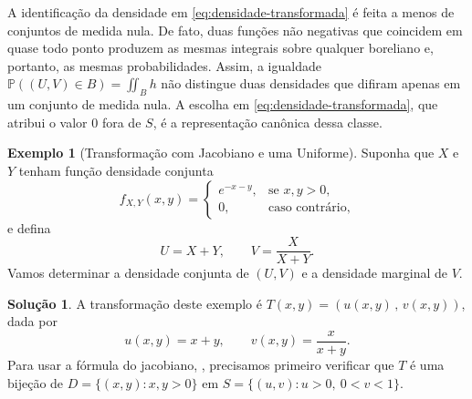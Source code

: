 \documentclass[12pt,portuguese]{article}
\theoremstyle{definition}
\newtheorem{example}[example]{Exemplo}
\theoremstyle{plainexercise}
\theoremstyle{starredexercise}
\theoremstyle{definition}
\newtheorem*{solution}{Solução}
\begin{document}
A identificação da densidade em \eqref{eq:densidade-transformada} é feita
a menos de conjuntos de medida nula. De fato, duas funções não negativas
que coincidem em quase todo ponto produzem as mesmas integrais sobre
qualquer boreliano e, portanto, as mesmas probabilidades. Assim, a
igualdade $\mathbb{P}((U, V) \in B) = \iint_B h$ não distingue duas
densidades que difiram apenas em um conjunto de medida nula. A escolha em
\eqref{eq:densidade-transformada}, que atribui o valor $0$ fora de $S$, é
a representação canônica dessa classe.

\begin{example}[Transformação com Jacobiano e uma Uniforme]\label{ex:transformacao-jacobiano}
Suponha que $X$ e $Y$ tenham função densidade conjunta
\begin{equation}\label{eq:densidade-conjunta-jacobiano}
  f_{X,Y}(x,y) =
  \begin{cases}
    e^{-x-y}, & \text{se } x, y > 0, \\[0.2cm]
    0, & \text{caso contrário},
  \end{cases}
\end{equation}
e defina
\[
  U = X + Y, \qquad V = \frac{X}{X+Y}.
\]
Vamos determinar a densidade conjunta de $(U,V)$ e a densidade marginal de
$V$.

\begin{solution}
  A transformação deste exemplo é $T(x,y) = (u(x,y)\, ,\, v(x,y))$, dada por
  \begin{equation}\label{eq:transformacao-jacobiano-exemplo}
    u(x,y) = x + y, \qquad v(x,y) = \frac{x}{x+y}.
  \end{equation}
  Para usar a fórmula do jacobiano, , precisamos
  primeiro verificar que $T$ é uma bijeção de
  $D = \{(x,y) : x, y > 0\}$ em $S = \{(u,v) : u > 0,\ 0 < v < 1\}$.
\begin{figure}[H]
\centering
{}
\end{figure}
\end{solution}
\end{example}
\end{document}
